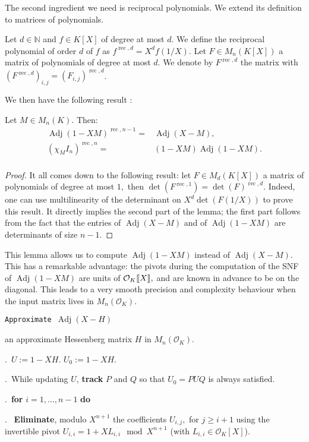 \documentclass{sig-alternate-05-2015}
\DeclareMathOperator{\adj}{Adj}
\DeclareMathOperator{\rec}{rec}
\newcommand{\OK}{\mathcal{O}_K}
\newcommand{\llb}{[\mkern-2.5mu[}
\newcommand{\rrb}{]\mkern-2.5mu]}
\begin{document}
The second ingredient we need is reciprocal polynomials.
We extend its definition to matrices of polynomials.
\begin{deftn}
Let $d \in \mathbb{N}$ and $f \in K[X]$ of degree at most $d.$ 
We define the reciprocal polynomial of order $d$ of $f$ as $f^{\rec,d}=X^d f \left( 1/X \right).$
Let $F \in M_n(K[X])$ a matrix of polynomials of degree at most $d.$
We denote by $F^{\rec,d}$ the matrix with $(F^{\rec,d})_{i,j} = (F_{i,j})^{\rec,d}$.
\end{deftn}
We then have the following result :
\begin{lem}
Let $M \in M_n(K).$ Then:
\begin{eqnarray*}
\adj(1-XM)^{\rec,n-1}=&\adj(X-M), \\
(\chi_M I_n)^{\rec,n}=&(1-XM) \adj(1-XM).\\
\end{eqnarray*}
\end{lem}
\begin{proof}
It all comes down to the following result:
let $F \in M_d(K[X])$ a matrix of polynomials of degree at most $1,$
then $\det (F^{\rec,1})=\det(F)^{\rec,d}.$
Indeed, one can use multilinearity of the determinant on $X^d \det(F(1/X))$
to prove this result.
It directly implies the second part of the lemma; the first part follows
from the fact that the entries of $\adj(X-M)$ and of $\adj(1-XM)$
are determinants of size $n-1$.
\end{proof}

This lemma allows us to compute $\adj(1-XM)$ instead of $\adj(X-M).$
This has a remarkable advantage: the pivots during the computation of
the SNF of $\adj(1-XM)$ are units of $\OK\llb X\rrb,$ and are known
in advance to be on the diagonal. This leads to a very smooth
precision and complexity behaviour when the input matrix lives in 
$M_n(\OK).$ 

\noindent\hrulefill

 {\tt Approximate $\adj (X -H)$ }

 an approximate Hessenberg matrix $H$ in $M_n(\OK).$

\smallskip

.\ $U:=1-XH.$ $U_0:=1-XH.$

.\ While updating $U$, \textbf{track} $P$ and $Q$ so that $U_0=PUQ$ is always satisfied.

.\ {\bf for} $i=1,\dots,n-1$ {\bf do} 

.\  \:  \textbf{Eliminate}, modulo $X^{n+1}$ the coefficients $U_{i,j},$ for $j\geq i+1$ 
using the invertible pivot
$U_{i,i}=1+XL_{i,i} \mod X^{n+1}$ (with $L_{i,i} \in \OK[X]$). 
\end{document}
